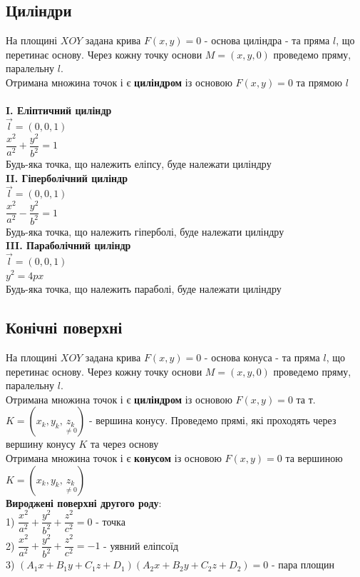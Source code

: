 \documentclass[a4paper, 14pt]{extarticle}
\def\bigline{\vspace{5mm}\\}
\begin{document}
\subsection{Циліндри}
На площині $XOY$ задана крива $F(x,y) = 0$ - основа циліндра - та пряма $l$, що перетинає основу. Через кожну точку основи $M = (x,y,0)$ проведемо пряму, паралельну $l$.\\
Отримана множина точок і є \textbf{циліндром} із основою $F(x,y) = 0$ та прямою $l$\\
\bigline
\textbf{I. Еліптичний циліндр}\\
$\vec{l} = (0,0,1)$\\
$\dfrac{x^2}{a^2} + \dfrac{y^2}{b^2} = 1$\\
Будь-яка точка, що належить еліпсу, буде належати циліндру
\bigline
\textbf{II. Гіперболічний циліндр}\\
$\vec{l} = (0,0,1)$\\
$\dfrac{x^2}{a^2} - \dfrac{y^2}{b^2} = 1$\\
Будь-яка точка, що належить гіперболі, буде належати циліндру
\bigline
\textbf{III. Параболічний циліндр}\\
$\vec{l} = (0,0,1)$\\
$y^2 = 4px$\\
Будь-яка точка, що належить параболі, буде належати циліндру
\bigline
\subsection{Конічні поверхні}
На площині $XOY$ задана крива $F(x,y) = 0$ - основа конуса - та пряма $l$, що перетинає основу. Через кожну точку основи $M = (x,y,0)$ проведемо пряму, паралельну $l$.\\
Отримана множина точок і є \textbf{циліндром} із основою $F(x,y) = 0$ та т. $K = (x_k, y_k, \underset{\neq 0}{z_k})$ - вершина конусу. Проведемо прямі, які проходять через вершину конусу $K$ та через основу\\
Отримана множина точок і є \textbf{конусом} із основою $F(x,y) = 0$ та вершиною $K = (x_k, y_k, \underset{\neq 0}{z_k})$
\bigline
\textbf{Вироджені поверхні другого роду}:\\
1) $\dfrac{x^2}{a^2} + \dfrac{y^2}{b^2} + \dfrac{z^2}{c^2} = 0$ - точка\\
2) $\dfrac{x^2}{a^2} + \dfrac{y^2}{b^2} + \dfrac{z^2}{c^2} = -1$ - уявний еліпсоїд\\
3) $(A_1 x + B_1 y + C_1 z + D_1)(A_2 x + B_2 y + C_2 z + D_2) = 0$ - пара площин
\newpage
\end{document}
